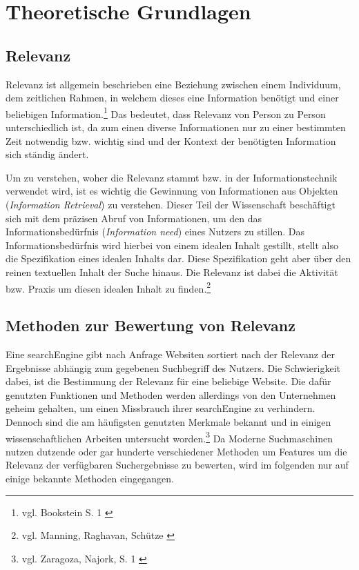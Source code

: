 \chapter{Theoretische Grundlagen}
\label{ch:grundlagen}

\section{Relevanz}

Relevanz ist allgemein beschrieben eine Beziehung zwischen einem Individuum, dem zeitlichen Rahmen, in welchem dieses eine Information benötigt und einer beliebigen Information.\footnote{vgl. Bookstein S. 1 \cite{bookstein2007}}
Das bedeutet, dass Relevanz von Person zu Person unterschiedlich ist, da zum einen diverse Informationen nur zu einer bestimmten Zeit notwendig bzw. wichtig sind und der Kontext der benötigten Information sich ständig ändert.

Um zu verstehen, woher die Relevanz stammt bzw. in der Informationstechnik verwendet wird, ist es wichtig die Gewinnung von Informationen aus Objekten (\emph{Information Retrieval}) zu verstehen.
Dieser Teil der Wissenschaft beschäftigt sich mit dem präzisen Abruf von Informationen, um den das Informationsbedürfnis (\emph{Information need}) eines Nutzers zu stillen.
Das Informationsbedürfnis wird hierbei von einem idealen Inhalt gestillt, stellt also die Spezifikation eines idealen Inhalts dar. Diese Spezifikation geht aber über den reinen textuellen Inhalt der Suche hinaus. Die Relevanz ist dabei die Aktivität bzw. Praxis um diesen idealen Inhalt zu finden.\footnote{vgl. Manning, Raghavan, Schütze \cite{manning2008}}

\section{Methoden zur Bewertung von Relevanz}

Eine \gls{searchEngine} gibt nach Anfrage Websiten sortiert nach der Relevanz der Ergebnisse abhängig zum gegebenen Suchbegriff des Nutzers.
Die Schwierigkeit dabei, ist die Bestimmung der Relevanz für eine beliebige Website.
Die dafür genutzten Funktionen und Methoden werden allerdings von den Unternehmen geheim gehalten, um einen Missbrauch ihrer \gls{searchEngine} zu verhindern.
Dennoch sind die am häufigsten genutzten Merkmale bekannt und in einigen wissenschaftlichen Arbeiten untersucht worden.\footnote{vgl. Zaragoza, Najork, S. 1 \cite{zaragoza2018}}
Da Moderne Suchmaschinen nutzen dutzende oder gar hunderte verschiedener Methoden um Features um die Relevanz der verfügbaren Suchergebnisse zu bewerten, wird im folgenden nur auf einige bekannte Methoden eingegangen.

